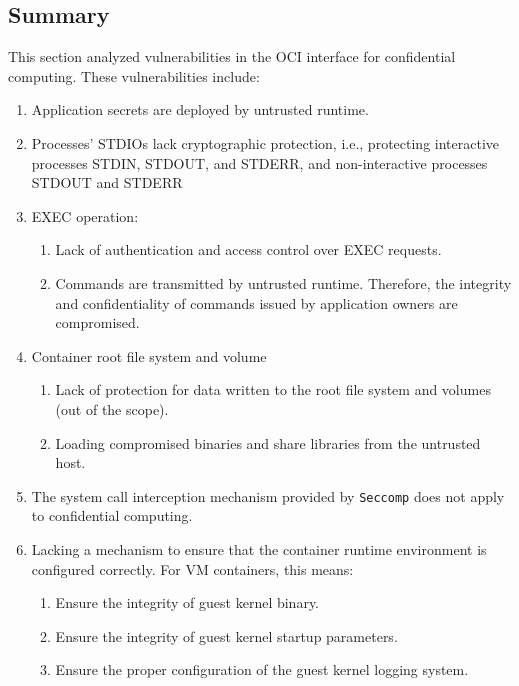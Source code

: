 \subsection{Summary}
\label{sec:security_analyse_oci_summary}
This section analyzed vulnerabilities in the OCI interface for confidential computing. These vulnerabilities include:
 \begin{enumerate}
  \item\label{vulnerability:1} Application secrets are deployed by untrusted runtime.
  \item\label{vulnerabilities:2} Processes' STDIOs lack cryptographic protection, i.e., protecting interactive processes STDIN, STDOUT, and STDERR, and non-interactive processes STDOUT and STDERR
  \item\label{vulnerabilities:3}EXEC operation:
      \begin{enumerate}
        \item Lack of authentication and access control over EXEC requests.
        \item Commands are transmitted by untrusted runtime. Therefore, the integrity and confidentiality of commands issued by application owners are compromised.
      \end{enumerate}
  \item\label{vulnerabilities:4} Container root file system and volume
      \begin{enumerate}
        \item Lack of protection for data written to the root file system and volumes (out of the scope).
        \item Loading compromised binaries and share libraries from the untrusted host.
      \end{enumerate}
  \item\label{vulnerabilities:5} The system call interception mechanism provided by \texttt{Seccomp} does not apply to confidential computing.
  \item\label{vulnerabilities:6} Lacking a mechanism to ensure that the container runtime environment is configured correctly. For VM containers, this means:
      \begin{enumerate}
        \item Ensure the integrity of guest kernel binary.
        \item\label{vulnerabilities:10} Ensure the integrity of guest kernel startup parameters.
        \item\label{vulnerabilities:11} Ensure the proper configuration of the guest kernel logging system.
      \end{enumerate}
\end{enumerate}


